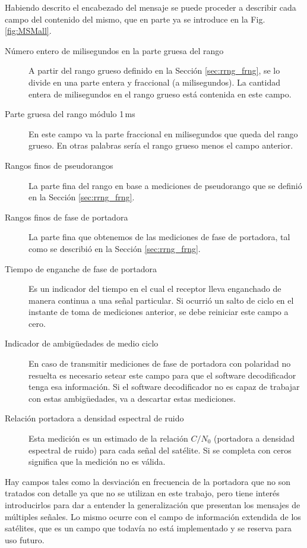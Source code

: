 \documentclass[a4paper,12pt,oneside,onecolumn,final,openright]{book}%
\begin{document}
	Habiendo descrito el encabezado del mensaje se puede proceder a describir cada campo del contenido del mismo, que en parte ya se introduce en la Fig. \ref{fig:MSMall}. 
\begin{description}
	\item[Número entero de milisegundos en la parte gruesa del rango] A partir del rango grueso definido en la Sección \ref{sec:rrng_frng}, se lo divide en una parte entera y fraccional (a milisegundos). La cantidad entera de milisegundos en el rango grueso está contenida en este campo.
	\item[Parte gruesa del rango módulo 1\,ms] En este campo va la parte fraccional en milisegundos que queda del rango grueso. En otras palabras sería el rango grueso menos el campo anterior.
	\item[Rangos finos de pseudorangos] La parte fina del rango en base a mediciones de pseudorango que se definió en la Sección \ref{sec:rrng_frng}.
	\item[Rangos finos de fase de portadora] La parte fina que obtenemos de las mediciones de fase de portadora, tal como se describió en la Sección \ref{sec:rrng_frng}.
	\item[Tiempo de enganche de fase de portadora] Es un indicador del tiempo en el cual el receptor lleva enganchado de manera continua a una señal particular. Si ocurrió un salto de ciclo en el instante de toma de mediciones anterior, se debe reiniciar este campo a cero.
	\item[Indicador de ambigüedades de medio ciclo] En caso de transmitir mediciones de fase de portadora con polaridad no resuelta es necesario setear este campo para que el software decodificador tenga esa información. Si el software decodificador no es capaz de trabajar con estas ambigüedades, va a descartar estas mediciones.
	\item[Relación portadora a densidad espectral de ruido] Esta medición es un estimado de la relación $C/N_0$ (portadora a densidad espectral de ruido) para cada señal del satélite. Si se completa con ceros significa que la medición no es válida.
\end{description}

	Hay campos tales como la desviación en frecuencia de la portadora que no son tratados con detalle ya que no se utilizan en este trabajo, pero tiene interés introducirlos para dar a entender la generalización que presentan los mensajes de múltiples señales. Lo mismo ocurre con el campo de información extendida de los satélites, que es un campo que todavía no está implementado y se reserva para uso futuro.\\
\end{document}
